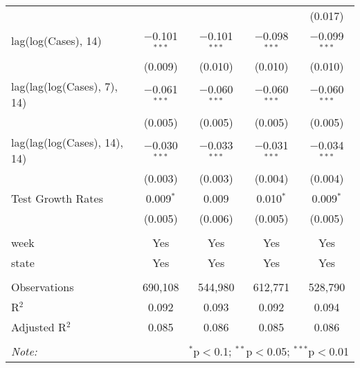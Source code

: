 \begin{tabular}{@{\extracolsep{1pt}}lcccc}
  &  &  &  & (0.017) \\ 
  lag(log(Cases), 14) & $-$0.101$^{***}$ & $-$0.101$^{***}$ & $-$0.098$^{***}$ & $-$0.099$^{***}$ \\ 
  & (0.009) & (0.010) & (0.010) & (0.010) \\ 
  lag(lag(log(Cases), 7), 14) & $-$0.061$^{***}$ & $-$0.060$^{***}$ & $-$0.060$^{***}$ & $-$0.060$^{***}$ \\ 
  & (0.005) & (0.005) & (0.005) & (0.005) \\ 
  lag(lag(log(Cases), 14), 14) & $-$0.030$^{***}$ & $-$0.033$^{***}$ & $-$0.031$^{***}$ & $-$0.034$^{***}$ \\ 
  & (0.003) & (0.003) & (0.004) & (0.004) \\ 
  Test Growth Rates & 0.009$^{*}$ & 0.009 & 0.010$^{*}$ & 0.009$^{*}$ \\ 
  & (0.005) & (0.006) & (0.005) & (0.005) \\ 
 \hline \\[-1.8ex] 
week & Yes & Yes & Yes & Yes \\ 
state & Yes & Yes & Yes & Yes \\ 
\hline \\[-1.8ex] 
Observations & 690,108 & 544,980 & 612,771 & 528,790 \\ 
R$^{2}$ & 0.092 & 0.093 & 0.092 & 0.094 \\ 
Adjusted R$^{2}$ & 0.085 & 0.086 & 0.085 & 0.086 \\ 
\hline 
\hline \\[-1.8ex] 
\textit{Note:}  & \multicolumn{4}{r}{$^{*}$p$<$0.1; $^{**}$p$<$0.05; $^{***}$p$<$0.01} \\ 
\end{tabular} 